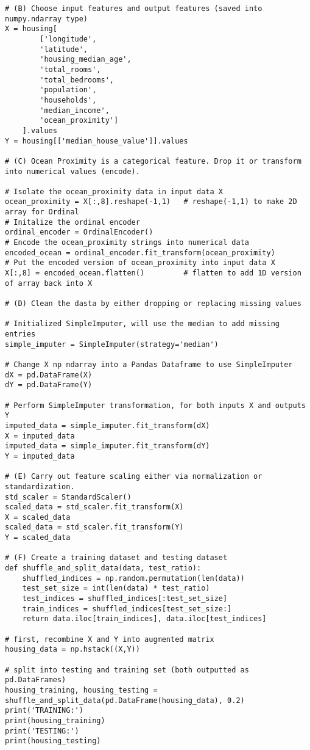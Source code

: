 \documentclass[11pt]{article}
\begin{document}
\begin{enumerate}[start=1,label={\bfseries Question \arabic*:},leftmargin=1in]
\begin{lstlisting}
# (B) Choose input features and output features (saved into numpy.ndarray type)
X = housing[
        ['longitude',
        'latitude',
        'housing_median_age',
        'total_rooms',
        'total_bedrooms',
        'population',
        'households',
        'median_income',
        'ocean_proximity']
    ].values
Y = housing[['median_house_value']].values

# (C) Ocean Proximity is a categorical feature. Drop it or transform into numerical values (encode).

# Isolate the ocean_proximity data in input data X
ocean_proximity = X[:,8].reshape(-1,1)   # reshape(-1,1) to make 2D array for Ordinal
# Initalize the ordinal encoder
ordinal_encoder = OrdinalEncoder()
# Encode the ocean_proximity strings into numerical data
encoded_ocean = ordinal_encoder.fit_transform(ocean_proximity)
# Put the encoded version of ocean_proximity into input data X
X[:,8] = encoded_ocean.flatten()         # flatten to add 1D version of array back into X

# (D) Clean the dasta by either dropping or replacing missing values

# Initialized SimpleImputer, will use the median to add missing entries
simple_imputer = SimpleImputer(strategy='median')

# Change X np ndarray into a Pandas Dataframe to use SimpleImputer
dX = pd.DataFrame(X)
dY = pd.DataFrame(Y)

# Perform SimpleImputer transformation, for both inputs X and outputs Y
imputed_data = simple_imputer.fit_transform(dX)
X = imputed_data
imputed_data = simple_imputer.fit_transform(dY)
Y = imputed_data

# (E) Carry out feature scaling either via normalization or standardization.
std_scaler = StandardScaler()
scaled_data = std_scaler.fit_transform(X)
X = scaled_data
scaled_data = std_scaler.fit_transform(Y)
Y = scaled_data

# (F) Create a training dataset and testing dataset
def shuffle_and_split_data(data, test_ratio):
    shuffled_indices = np.random.permutation(len(data))
    test_set_size = int(len(data) * test_ratio)
    test_indices = shuffled_indices[:test_set_size]
    train_indices = shuffled_indices[test_set_size:]
    return data.iloc[train_indices], data.iloc[test_indices]

# first, recombine X and Y into augmented matrix
housing_data = np.hstack((X,Y))

# split into testing and training set (both outputted as pd.DataFrames)
housing_training, housing_testing = shuffle_and_split_data(pd.DataFrame(housing_data), 0.2)
print('TRAINING:')
print(housing_training)
print('TESTING:')
print(housing_testing)
        \end{lstlisting}

\end{enumerate}



\end{document}
